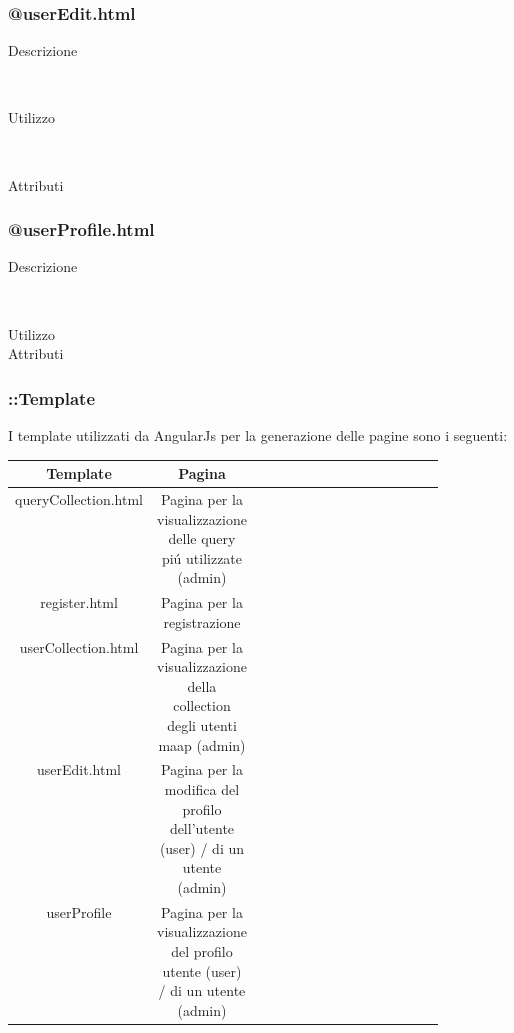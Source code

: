 \subsubsection{@userEdit.html}
\begin{description}
	\item[Descrizione] \hfill \\
	
	\item[Utilizzo] \hfill \\
	
	\item[Attributi] \hfill
 	
\end{description}

\subsubsection{@userProfile.html}
\begin{description}
	\item[Descrizione] \hfill \\
	
	\item[Utilizzo]
	
	\item[Attributi] \hfill
 	
\end{description}

\subsubsection{::Template}
I template utilizzati da AngularJs per la generazione delle pagine sono i seguenti:

\begin{center}
\begin{longtable}{|c|c|c|p{0.5\linewidth}|}
\toprule
\textbf{Template} & \textbf{Pagina} \\

 \midrule
queryCollection.html & Pagina per la visualizzazione delle query pi\'{u} utilizzate (admin)\\
 \midrule
register.html & Pagina per la registrazione\\
 \midrule
userCollection.html & Pagina per la visualizzazione della collection degli utenti maap (admin)\\
 \midrule
userEdit.html & Pagina per la modifica del profilo dell'utente (user) / di un utente (admin)\\
 \midrule
userProfile & Pagina per la visualizzazione del profilo utente (user) / di un utente (admin)\\
 \bottomrule
 
\end{longtable}
\end{center}


